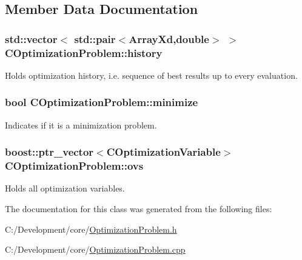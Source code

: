 \subsection{Member Data Documentation}
\hypertarget{class_c_optimization_problem_a86bb928e976091481a4f26db15a67ff5}{
\subsubsection[{history}]{\setlength{\rightskip}{0pt plus 5cm}std\-::vector$<$ std\-::pair$<$Array\-Xd,double$>$ $>$ C\-Optimization\-Problem\-::history\hspace{0.3cm}{\ttfamily [protected]}}}\label{class_c_optimization_problem_a86bb928e976091481a4f26db15a67ff5}
Holds optimization history, i.\-e. sequence of best results up to every evaluation. \hypertarget{class_c_optimization_problem_a142569515a786cf11c7ec6337e9aca61}{
\subsubsection[{minimize}]{\setlength{\rightskip}{0pt plus 5cm}bool C\-Optimization\-Problem\-::minimize\hspace{0.3cm}{\ttfamily [protected]}}}\label{class_c_optimization_problem_a142569515a786cf11c7ec6337e9aca61}


Indicates if it is a minimization problem. 

\hypertarget{class_c_optimization_problem_a42fa0c335f002a47acab9e846bbc13ea}{
\subsubsection[{ovs}]{\setlength{\rightskip}{0pt plus 5cm}boost\-::ptr\-\_\-vector$<${\bf C\-Optimization\-Variable}$>$ C\-Optimization\-Problem\-::ovs\hspace{0.3cm}{\ttfamily [protected]}}}\label{class_c_optimization_problem_a42fa0c335f002a47acab9e846bbc13ea}


Holds all optimization variables. 



The documentation for this class was generated from the following files\-:\begin{DoxyCompactItemize}
\item 
C\-:/\-Development/core/\hyperlink{_optimization_problem_8h}{Optimization\-Problem.\-h}\item 
C\-:/\-Development/core/\hyperlink{_optimization_problem_8cpp}{Optimization\-Problem.\-cpp}\end{DoxyCompactItemize}
